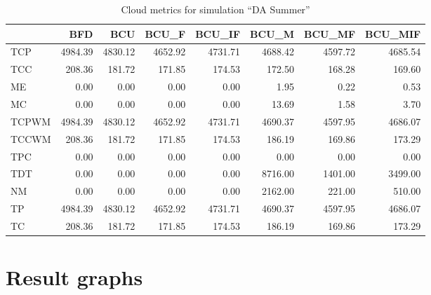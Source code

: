 \begin{table}[ht]
\centering
\begin{tabular}{lrrrrrrr}
\toprule
{} &      BFD &      BCU &    BCU\_F &   BCU\_IF &    BCU\_M &   BCU\_MF &  BCU\_MIF \\
\midrule
TCP   &  4984.39 &  4830.12 &  4652.92 &  4731.71 &  4688.42 &  4597.72 &  4685.54 \\
TCC   &   208.36 &   181.72 &   171.85 &   174.53 &   172.50 &   168.28 &   169.60 \\
ME    &     0.00 &     0.00 &     0.00 &     0.00 &     1.95 &     0.22 &     0.53 \\
MC    &     0.00 &     0.00 &     0.00 &     0.00 &    13.69 &     1.58 &     3.70 \\
TCPWM &  4984.39 &  4830.12 &  4652.92 &  4731.71 &  4690.37 &  4597.95 &  4686.07 \\
TCCWM &   208.36 &   181.72 &   171.85 &   174.53 &   186.19 &   169.86 &   173.29 \\
TPC   &     0.00 &     0.00 &     0.00 &     0.00 &     0.00 &     0.00 &     0.00 \\
TDT   &     0.00 &     0.00 &     0.00 &     0.00 &  8716.00 &  1401.00 &  3499.00 \\
NM    &     0.00 &     0.00 &     0.00 &     0.00 &  2162.00 &   221.00 &   510.00 \\
TP    &  4984.39 &  4830.12 &  4652.92 &  4731.71 &  4690.37 &  4597.95 &  4686.07 \\
TC    &   208.36 &   181.72 &   171.85 &   174.53 &   186.19 &   169.86 &   173.29 \\
\bottomrule
\end{tabular}
\caption{Cloud metrics for simulation "`DA Summer"'}
\end{table}




\section{Result graphs}